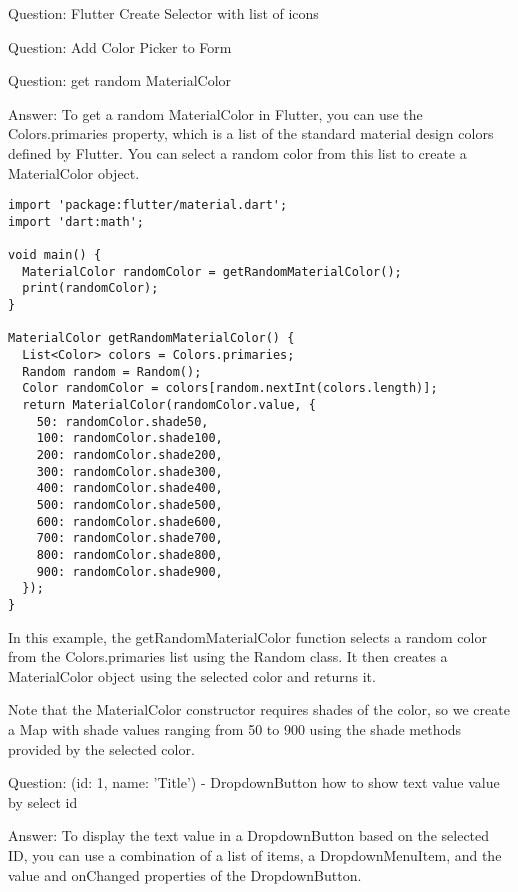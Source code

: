 Question: Flutter Create Selector with list of icons

Question: Add Color Picker to Form

Question: get random MaterialColor

Answer: To get a random MaterialColor in Flutter, you can use the Colors.primaries property, which is a list of 
the standard material design colors defined by Flutter. You can select a random color from this list to create
a MaterialColor object.

\begin{lstlisting}
import 'package:flutter/material.dart';
import 'dart:math';

void main() {
  MaterialColor randomColor = getRandomMaterialColor();
  print(randomColor);
}

MaterialColor getRandomMaterialColor() {
  List<Color> colors = Colors.primaries;
  Random random = Random();
  Color randomColor = colors[random.nextInt(colors.length)];
  return MaterialColor(randomColor.value, {
    50: randomColor.shade50,
    100: randomColor.shade100,
    200: randomColor.shade200,
    300: randomColor.shade300,
    400: randomColor.shade400,
    500: randomColor.shade500,
    600: randomColor.shade600,
    700: randomColor.shade700,
    800: randomColor.shade800,
    900: randomColor.shade900,
  });
}
\end{lstlisting}

In this example, the getRandomMaterialColor function selects a random color from the Colors.primaries list using the 
Random class. It then creates a MaterialColor object using the selected color and returns it.

Note that the MaterialColor constructor requires shades of the color, so we create a Map with shade values ranging 
from 50 to 900 using the shade methods provided by the selected color.

Question: (id: 1, name: 'Title') - DropdownButton how to show text value value by select id

Answer: To display the text value in a DropdownButton based on the selected ID, you can use a combination of a list 
of items, a DropdownMenuItem, and the value and onChanged properties of the DropdownButton.

